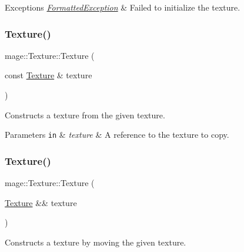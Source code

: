 \begin{DoxyExceptions}{Exceptions}
{\em \hyperlink{structmage_1_1_formatted_exception}{Formatted\+Exception}} & Failed to initialize the texture. \\
\hline
\end{DoxyExceptions}
\hypertarget{classmage_1_1_texture_aed9e8ab5bc3efdeb381672fd4e243ea7}{}\label{classmage_1_1_texture_aed9e8ab5bc3efdeb381672fd4e243ea7} 
\subsubsection{\texorpdfstring{Texture()}{Texture()}\hspace{0.1cm}{\footnotesize\ttfamily [2/3]}}
{\footnotesize\ttfamily mage\+::\+Texture\+::\+Texture (\begin{DoxyParamCaption}\item[{const \hyperlink{classmage_1_1_texture}{Texture} \&}]{texture }\end{DoxyParamCaption})\hspace{0.3cm}{\ttfamily [delete]}}

Constructs a texture from the given texture.


\begin{DoxyParams}[1]{Parameters}
\mbox{\tt in}  & {\em texture} & A reference to the texture to copy. \\
\hline
\end{DoxyParams}
\hypertarget{classmage_1_1_texture_a9297257bfe76e744cb02bbbb51f73348}{}\label{classmage_1_1_texture_a9297257bfe76e744cb02bbbb51f73348} 
\subsubsection{\texorpdfstring{Texture()}{Texture()}\hspace{0.1cm}{\footnotesize\ttfamily [3/3]}}
{\footnotesize\ttfamily mage\+::\+Texture\+::\+Texture (\begin{DoxyParamCaption}\item[{\hyperlink{classmage_1_1_texture}{Texture} \&\&}]{texture }\end{DoxyParamCaption})\hspace{0.3cm}{\ttfamily [default]}}

Constructs a texture by moving the given texture.


